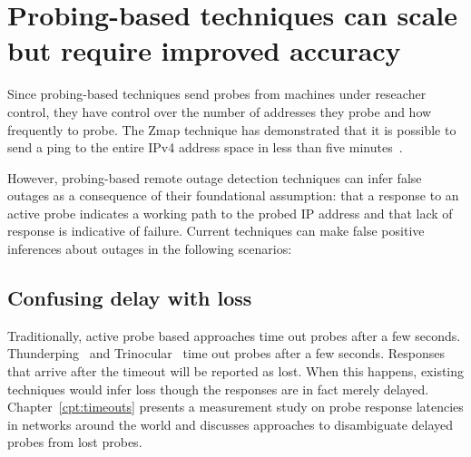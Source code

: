 
\section{Probing-based techniques can
scale but require improved accuracy}


Since probing-based techniques send probes from machines under
reseacher control, they have control over the number of addresses they
probe and how frequently to probe. The Zmap technique has demonstrated
that it is possible to send a ping to the entire IPv4 address space
in less than five minutes~\cite{zippier-zmap}.

However, probing-based remote outage detection techniques can infer false
outages as a consequence of their foundational assumption:
that a response to an active probe indicates a working path to the
probed IP address and that lack of response is indicative of
failure. Current techniques can make false positive inferences about
outages in the following scenarios:



\subsection{Confusing delay with loss}

Traditionally, active probe based approaches time out probes after a
few seconds. Thunderping~\cite{pingin} and
Trinocular~\cite{trinocular} time out probes after a few
seconds. Responses that arrive after the timeout will be reported as
lost. When this happens, existing techniques would infer loss though
the responses are in fact merely delayed. Chapter~\ref{cpt:timeouts}
presents a measurement study on probe response latencies in networks
around the world and discusses approaches to disambiguate delayed
probes from lost probes.

